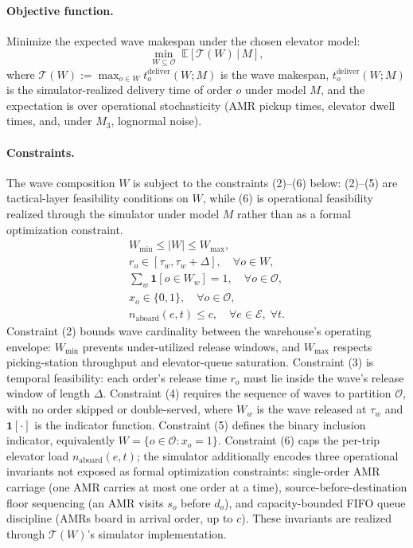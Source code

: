 \documentclass[11pt, a4paper]{article}
\begin{document}
\paragraph{Objective function.} Minimize the expected wave makespan under the chosen elevator model:
\begin{equation}\label{eq:obj}\tag{1}
\min_{W \subseteq \mathcal{O}} \; \mathbb{E}\!\left[\mathcal{T}(W) \,\big|\, M\right],
\end{equation}
where $\mathcal{T}(W) := \max_{o \in W} t^{\text{deliver}}_o(W; M)$ is the wave makespan, $t^{\text{deliver}}_o(W; M)$ is the simulator-realized delivery time of order $o$ under model $M$, and the expectation is over operational stochasticity (AMR pickup times, elevator dwell times, and, under $M_3$, lognormal noise).

\paragraph{Constraints.} The wave composition $W$ is subject to the constraints (2)--(6) below: (2)--(5) are tactical-layer feasibility conditions on $W$, while (6) is operational feasibility realized through the simulator under model $M$ rather than as a formal optimization constraint.
\begin{gather}
W_{\min} \leq |W| \leq W_{\max}, \label{eq:c-card}\tag{2} \\
r_o \in [\tau_w, \tau_w + \Delta], \quad \forall o \in W, \label{eq:c-window}\tag{3} \\
\sum_{w} \mathbf{1}[o \in W_w] = 1, \quad \forall o \in \mathcal{O}, \label{eq:c-uniq}\tag{4} \\
x_o \in \{0, 1\}, \quad \forall o \in \mathcal{O}, \label{eq:c-dom}\tag{5} \\
n_{\text{aboard}}(e, t) \leq c, \quad \forall e \in \mathcal{E}, \; \forall t. \label{eq:c-op}\tag{6}
\end{gather}
Constraint (2) bounds wave cardinality between the warehouse's operating envelope: $W_{\min}$ prevents under-utilized release windows, and $W_{\max}$ respects picking-station throughput and elevator-queue saturation. Constraint (3) is temporal feasibility: each order's release time $r_o$ must lie inside the wave's release window of length $\Delta$. Constraint (4) requires the sequence of waves to partition $\mathcal{O}$, with no order skipped or double-served, where $W_w$ is the wave released at $\tau_w$ and $\mathbf{1}[\cdot]$ is the indicator function. Constraint (5) defines the binary inclusion indicator, equivalently $W = \{o \in \mathcal{O} : x_o = 1\}$. Constraint (6) caps the per-trip elevator load $n_{\text{aboard}}(e, t)$; the simulator additionally encodes three operational invariants not exposed as formal optimization constraints: single-order AMR carriage (one AMR carries at most one order at a time), source-before-destination floor sequencing (an AMR visits $s_o$ before $d_o$), and capacity-bounded FIFO queue discipline (AMRs board in arrival order, up to $c$). These invariants are realized through $\mathcal{T}(W)$'s simulator implementation.
\end{document}
